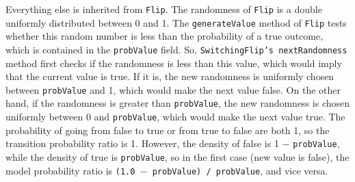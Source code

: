 Everything else is inherited from \texttt{Flip}. The randomness of \texttt{Flip} is a double uniformly distributed between 0 and 1. The \texttt{generateValue} method of \texttt{Flip} tests whether this random number is less than the probability of a true outcome, which is contained in the \texttt{probValue} field. So, \texttt{SwitchingFlip's nextRandomness} method first checks if the randomness is less than this value, which would imply that the current value is true. If it is, the new randomness is uniformly chosen between \texttt{probValue} and
1, which would make the next value false. On the other hand, if the randomness is greater than \texttt{probValue}, the new randomness is chosen uniformly between 0 and \texttt{probValue}, which would make the next value true. The probability of going from false to true or from true to false are both 1, so the transition probability ratio is 1. However, the density of false is 1 $-$ \texttt{probValue}, while the density of true is \texttt{probValue}, so in the first case (new value is false), the model probability ratio is \texttt{(1.0 $-$ probValue) / probValue}, and vice versa.